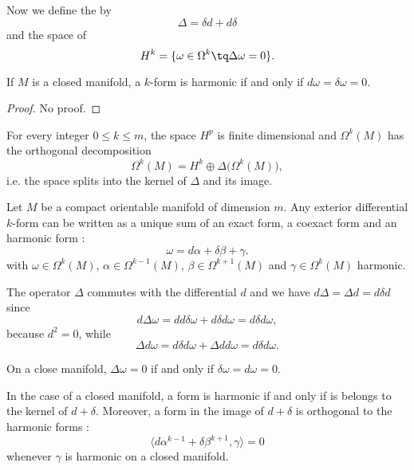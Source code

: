 Now we define the  by
\begin{equation}
	\Delta=\delta d+d\delta
\end{equation}
and the space of 
\begin{equation}
	H^k=\{ \omega\in\Omega^k\tq\Delta\omega=0 \}.
\end{equation}

\begin{lemma}
	If $M$ is a closed manifold, a $k$-form is harmonic if and only if $d\omega=\delta\omega=0$.
\end{lemma}

\begin{proof}
	No proof.
\end{proof}

\begin{theorem}
	For every integer $0\leq k\leq m$, the space $H^p$ is finite dimensional and $\Omega^k(M)$ has the orthogonal decomposition
	\begin{equation}
		\Omega^k(M)=H^k\oplus\Delta\big( \Omega^k(M) \big),
	\end{equation}
	i.e. the space splits into the kernel of $\Delta$ and its image.
\end{theorem}

\begin{theorem}
	Let $M$ be a compact orientable manifold of dimension $m$. Any exterior differential $k$-form can be written as a unique sum of an exact form, a coexact form and an harmonic form :
	\begin{equation}
		\omega=d\alpha+\delta\beta+\gamma.
	\end{equation}
	with $\omega\in\Omega^k(M)$, $\alpha\in\Omega^{k-1}(M)$, $\beta\in\Omega^{k+1}(M)$ and $\gamma\in\Omega^k(M)$ harmonic.
\end{theorem}

The operator $\Delta$ commutes with the differential $d$ and we have $d\Delta=\Delta d= d\delta d$ since
\begin{equation}
	d\Delta \omega=dd\delta\omega+d\delta d\omega=d\delta d\omega,
\end{equation}
because $d^2=0$, while
\begin{equation}
	\Delta d\omega=d\delta d\omega+\Delta d d\omega=d\delta d\omega.
\end{equation}

\begin{lemma}
	On a close manifold, $\Delta\omega=0$ if and only if $\delta\omega=d\omega=0$.
\end{lemma}

In the case of a closed manifold, a form is harmonic if and only if is belongs to the kernel of $d+\delta$. Moreover, a form in the image of $d+\delta$ is orthogonal to the harmonic forms :
\begin{equation}
	\langle d\alpha^{k-1}+\delta\beta^{k+1}, \gamma\rangle =0
\end{equation}
whenever $\gamma$ is harmonic on a closed manifold.
